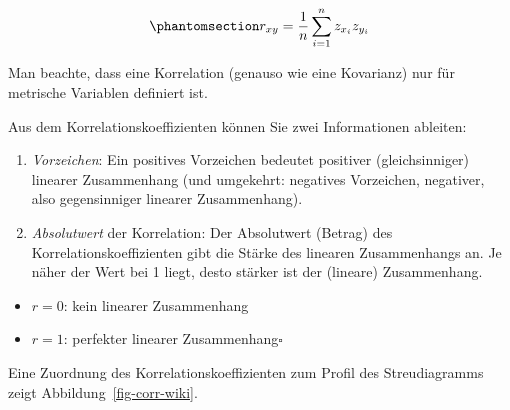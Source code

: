 \documentclass[
  letterpaper,
]{scrbook}
\providecommand{\tightlist}{%
  \setlength{\itemsep}{0pt}\setlength{\parskip}{0pt}}\usepackage{longtable,booktabs,array}
\theoremstyle{definition}
\theoremstyle{definition}
\theoremstyle{definition}
\theoremstyle{remark}
\begin{document}
\begin{equation}\phantomsection\label{eq-r-def}{r_{xy}=\frac{1}{n}\sum_{i=1}^n z_{x_i} z_{y_i}}\end{equation}

Man beachte, dass eine Korrelation (genauso wie eine Kovarianz) nur für
metrische Variablen definiert ist.

\begin{tcolorbox}[enhanced jigsaw, left=2mm, toptitle=1mm, toprule=.15mm, rightrule=.15mm, leftrule=.75mm, breakable, colbacktitle=quarto-callout-note-color!10!white, colback=white, coltitle=black, bottomtitle=1mm, opacityback=0, title=\textcolor{quarto-callout-note-color}{\faInfo}\hspace{0.5em}{Hinweis}, colframe=quarto-callout-note-color-frame, arc=.35mm, opacitybacktitle=0.6, bottomrule=.15mm, titlerule=0mm]

Aus dem Korrelationskoeffizienten können Sie zwei Informationen
ableiten:

\begin{enumerate}
\def\labelenumi{\arabic{enumi}.}
\tightlist
\item
  \emph{Vorzeichen}: Ein positives Vorzeichen bedeutet positiver
  (gleichsinniger) linearer Zusammenhang (und umgekehrt: negatives
  Vorzeichen, negativer, also gegensinniger linearer Zusammenhang).
\item
  \emph{Absolutwert} der Korrelation: Der Absolutwert (Betrag) des
  Korrelationskoeffizienten gibt die Stärke des linearen Zusammenhangs
  an. Je näher der Wert bei 1 liegt, desto stärker ist der (lineare)
  Zusammenhang.
\end{enumerate}

\begin{itemize}
\tightlist
\item
  \(r = 0\): kein linearer Zusammenhang
\item
  \(r = 1\): perfekter linearer Zusammenhang\(\square\)
\end{itemize}

\end{tcolorbox}

Eine Zuordnung des Korrelationskoeffizienten zum Profil des
Streudiagramms zeigt Abbildung~\ref{fig-corr-wiki}.
\end{document}
